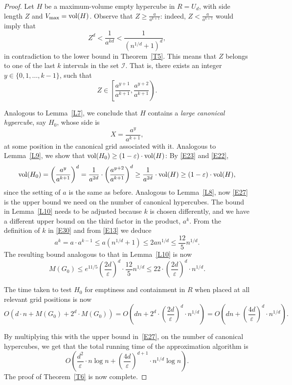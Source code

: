 \documentclass[11pt]{article}
\newcommand{\eps}{\varepsilon}
\def\I{\mathcal I}
\newcommand{\vol}{{\rm vol}}
\begin{document}
\begin{proof}
Let $H$ be a maximum-volume empty hypercube in $R=U_d$, with side
length $Z$ and $V_{\rm max}=\vol(H)$. Observe that $Z \geq \frac{a}{a^{k+1}}$: 
indeed, $Z <\frac{a}{a^{k+1}}$ would imply that 
$$ Z^d < \frac{1}{a^{kd}} < \frac{1}{(n^{1/d}+1)^d}, $$
in contradiction to the lower bound in Theorem~\ref{T5}. 
This means that $Z$ belongs to one of the last $k$ intervals in the
set $\I$. That is, there exists an integer $y \in \{0,1,\ldots,k-1\}$, such that 
\begin{equation} \label{E22}
Z \in \left[\frac{a^{y+1}}{a^{k+1}}, \frac{a^{y+2}}{a^{k+1}}\right). 
\end{equation} 

Analogous to Lemma~\ref{L7}, we conclude that $H$ contains a 
{\em large canonical hypercube}, say $H_0$, whose side is
\begin{equation} \label{E23}
X= \frac{a^{y}}{a^{k+1}}, 
\end{equation} 
at some position in the canonical grid associated with it. 
Analogous to Lemma~\ref{L9}, we show that 
$\vol(H_0) \geq (1-\eps) \cdot \vol(H)$:
By \eqref{E23} and \eqref{E22}, 
$$ \vol(H_0) = \left(\frac{a^{y}}{a^{k+1}}\right)^d=
\frac{1}{a^{2d}} \cdot \left(\frac{a^{y+2}}{a^{k+1}} \right)^d \geq
\frac{1}{a^{2d}} \cdot \vol(H) \geq (1-\eps) \cdot \vol(H),
$$
since the setting of $a$ is the same as before. 
Analogous to Lemma~\ref{L8}, now \eqref{E27} is the upper bound we
need on the number of canonical hypercubes. 
The bound in Lemma~\ref{L10} needs to be adjusted because $k$ is
chosen differently, and we have a different upper bound on the third
factor in the product, $a^k$. From the definition of $k$ in
\eqref{E30} and from \eqref{E13} we deduce 
$$ a^k =a \cdot a^{k-1} \leq a (n^{1/d} +1) \leq 
2a n^{1/d} \leq \frac{12}{5} n^{1/d}. $$
The resulting bound analogous to that in Lemma~\ref{L10} is now
\begin{equation} \label{E32}
M(G_0) \leq e^{11/5} \left( \frac{2d}{\eps} \right)^d \cdot 
\frac{12}{5} n^{1/d} \leq
22 \cdot \left( \frac{2d}{\eps} \right)^d \cdot n^{1/d}. 
\end{equation} 


The time taken to test $H_0$ for emptiness and containment in $R$ when
placed at all relevant grid positions is now
\begin{equation*} \label{E33}
O(d \cdot n + M(G_0) + 2^d \cdot M(G_0))=
O\left( dn + 2^d \cdot \left( \frac{2d}{\eps} \right)^d \cdot n^{1/d} \right)=
O\left( dn + \left( \frac{4d}{\eps} \right)^d \cdot n^{1/d} \right). 
\end{equation*} 


By multiplying this with the upper bound in~\eqref{E27}, 
on the number of canonical hypercubes, we get that the total
running time of the approximation algorithm is 
$$ O\left( \frac{d^2}{\eps} \cdot n \log{n} +
\left( \frac{4d}{\eps} \right)^{d+1} \cdot n^{1/d} \log{n}  \right). 
$$
The proof of Theorem~\ref{T6} is now complete.
\end{proof}
\end{document}
